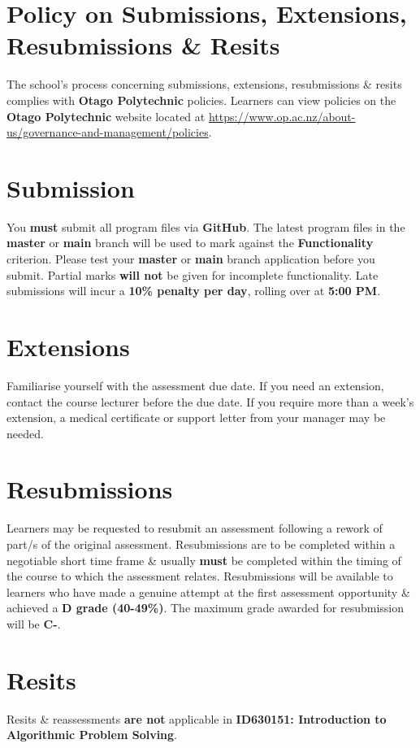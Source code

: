 \documentclass{article}
\begin{document}
\section*{Policy on Submissions, Extensions, Resubmissions \& Resits}
The school's process concerning submissions, extensions, resubmissions \& resits complies with \textbf{Otago Polytechnic} policies. Learners can view policies on the \textbf{Otago Polytechnic} website located at \href{https://www.op.ac.nz/about-us/governance-and-management/policies}{https://www.op.ac.nz/about-us/governance-and-management/policies}.

\section*{Submission}
You \textbf{must} submit all program files via \textbf{GitHub}. The latest program files in the \textbf{master} or \textbf{main} branch will be used to mark against the \textbf{Functionality} criterion. Please test your \textbf{master} or \textbf{main} branch application before you submit. Partial marks \textbf{will not} be given for incomplete functionality. Late submissions will incur a \textbf{10\% penalty per day}, rolling over at \textbf{5:00 PM}.

\section*{Extensions}
Familiarise yourself with the assessment due date. If you need an extension, contact the course lecturer before the due date. If you require more than a week's extension, a medical certificate or support letter from your manager may be needed.

\section*{Resubmissions}
Learners may be requested to resubmit an assessment following a rework of part/s of the original assessment. Resubmissions are to be completed within a negotiable short time frame \& usually \textbf{must} be completed within the timing of the course to which the assessment relates. Resubmissions will be available to learners who have made a genuine attempt at the first assessment opportunity \& achieved a \textbf{D grade (40-49\%)}. The maximum grade awarded for resubmission will be \textbf{C-}.

\section*{Resits}
Resits \& reassessments \textbf{are not} applicable in \textbf{ID630151: Introduction to Algorithmic Problem Solving}.
\end{document}
